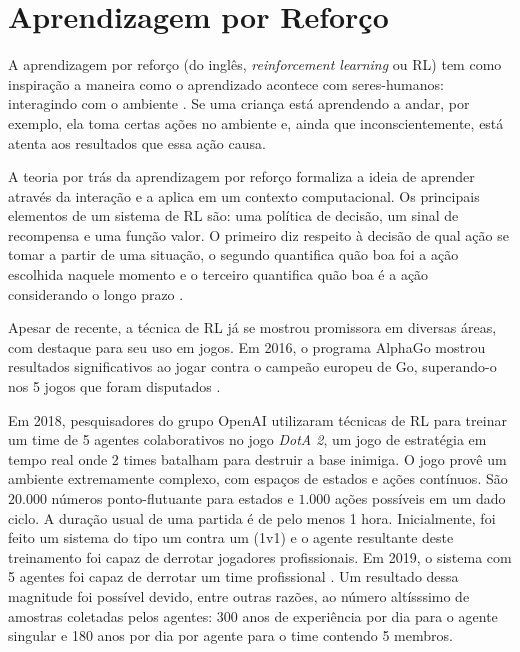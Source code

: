 \section{Aprendizagem por Reforço}
\par A aprendizagem por reforço (do inglês, \textit{reinforcement learning} ou RL) tem como inspiração a maneira como o aprendizado acontece com seres-humanos: interagindo com o ambiente \cite{sutton2018reinforcement}. Se uma criança está aprendendo a andar, por exemplo, ela toma certas ações no ambiente e, ainda que inconscientemente, está atenta aos resultados que essa ação causa. 
\par A teoria por trás da aprendizagem por reforço formaliza a ideia de aprender através da interação e a aplica em um contexto computacional. Os principais elementos de um sistema de RL são: uma política de decisão, um sinal de recompensa e uma função valor.  O primeiro diz respeito à decisão de qual ação se tomar a partir de uma situação, o segundo quantifica quão boa foi a ação escolhida naquele momento e o terceiro quantifica quão boa é a ação considerando o longo prazo \cite{sutton2018reinforcement}.
\par Apesar de recente, a técnica de RL já se mostrou promissora em diversas áreas, com destaque para seu uso em jogos. Em 2016, o programa AlphaGo mostrou resultados significativos ao jogar contra o campeão europeu de Go, superando-o nos 5 jogos que foram disputados \cite{SilverHuangEtAl16nature}.

Em 2018, pesquisadores do grupo OpenAI utilizaram técnicas de RL para treinar um time de 5 agentes colaborativos no jogo \textit{DotA 2}, um jogo de estratégia em tempo real onde 2 times batalham para destruir a base inimiga. O jogo provê um ambiente extremamente complexo, com espaços de estados e ações contínuos. São $20.000$ números ponto-flutuante para estados e $1.000$ ações possíveis em um dado ciclo.
A duração usual de uma partida é de pelo menos 1 hora. Inicialmente, foi feito um sistema do tipo um contra um (1v1) e o agente resultante deste treinamento foi capaz de derrotar jogadores profissionais. Em 2019, o sistema com 5 agentes foi capaz de derrotar um time profissional \cite{OpenAI_dota}. Um resultado dessa magnitude foi possível devido, entre outras razões, ao número altísssimo de amostras coletadas pelos agentes: 300 anos de experiência por dia para o agente singular e 180 anos por dia por agente para o time contendo 5 membros.

